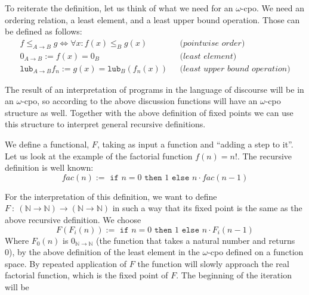 \documentclass[11pt, leqno]{article}
\theoremstyle{definition}
\begin{document}
To reiterate the definition, let us think of what we need for an $\omega$-cpo. We
need an ordering relation, a least element, and a least upper bound operation. Those
can be defined as follows:
\begin{align*}
  f\leq_{A \to B} g \Leftrightarrow \forall x: f(x) \leq_B g(x) & ~~~\textit{(pointwise order)}\\
  0_{A\to B} := f(x) = 0_B & ~~~\textit{(least element)}\\
  \texttt{lub}_{A\to B} f_n := g(x) = \texttt{lub}_B(f_n(x)) & ~~~\textit{(least upper
                                                               bound operation)}
\end{align*}


The result of an interpretation of programs in the language of discourse will be in
an $\omega$-cpo, so according to the above discussion functions will have an
$\omega$-cpo structure as well. Together with the above definition of fixed points we
can use this structure to interpret general recursive definitions. 

We define a functional, $F$, taking as input a function and ``adding a step to it''.
Let us look at the example of the factorial function $f(n) = n!$. %
The recursive definition is well known:
$$fac(n) := \texttt{ if } n = 0 \texttt{ then }1\texttt{ else } n\cdot fac(n-1)$$

For the interpretation of this definition, we want to define $F~:~(\mathbb{N} \to
\mathbb{N}) \to (\mathbb{N} \to \mathbb{N})$ in such a way that its fixed point is
the same as the above recursive definition. We choose
$$F(F_i(n)):=\texttt{ if }n=0\texttt{ then }1\texttt{ else }n\cdot F_i(n-1)$$
Where $F_0(n)$ is $0_{\mathbb{N} \to \mathbb{N}}$ (the function that takes a natural
number and returns 0), by the above definition of the least element in the
$\omega$-cpo defined on a function space. By repeated application of $F$ the function
will slowly approach the real factorial function, which is the fixed point of $F$.
The beginning of the iteration will be
\end{document}
